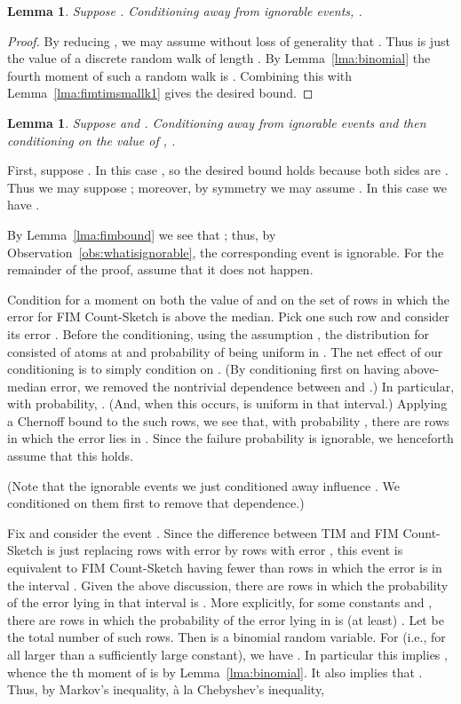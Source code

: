 \documentclass[letterpaper,11pt]{article}
\makeatletter
\newtheorem{lemma}[theorem]{Lemma}
\newenvironment{proof*}[1][\proofname]{\par 
\normalfont \partopsep=\z@skip \topsep=\z@skip 
  \trivlist 
  \item[\hskip\labelsep 
        \itshape 
    #1\@addpunct{.}]\ignorespaces 
}{\endtrivlist\@endpefalse 
}
\makeatother
\begin{document}
\begin{lemma} \label{lma:fimtimsmallk2}
Suppose .  Conditioning away from ignorable events, .
\end{lemma}
\begin{proof}
By reducing , we may assume without loss of generality that
.  Thus  is just the value of a discrete random walk
of length .  By Lemma~\ref{lma:binomial} the fourth
moment of such a random walk is .  Combining
this with Lemma~\ref{lma:fimtimsmallk1} gives the desired bound.
\end{proof}

\begin{lemma} \label{lma:fimtimsmallk3}
Suppose  and .  Conditioning away from ignorable events
and then conditioning on the value of ,
.
\end{lemma}
\begin{proof*}
First, suppose .  In this case ,
so the desired bound holds because both sides are .  Thus we may suppose ;
moreover, by symmetry we may assume .  In this case we have
.

By Lemma~\ref{lma:fimbound} we see that
; thus,
by Observation~\ref{obs:whatisignorable}, the corresponding
event is ignorable.  For the remainder of the proof, assume that it does not happen.

Condition for a moment on both the value of 
and on the set of  rows in which the error for FIM Count-Sketch
is above the median.  Pick one such row  and consider its error .
Before the conditioning, using the assumption ,
the distribution for  consisted of atoms at  and
 probability of being uniform in .  The net effect
of our conditioning is to simply condition on .
(By conditioning first on  having above-median error, we removed
the nontrivial dependence between  and .)
In particular, with  probability, .
(And, when this occurs,  is uniform in that interval.)
Applying a Chernoff bound to the 
such rows, we see that, with probability , there are
 rows in which the error lies in .
Since the failure probability is ignorable, we henceforth
assume that this holds.

(Note that the ignorable events we just conditioned away 
influence .  We conditioned on them first to remove that dependence.)

Fix  and consider the event .
Since the difference between TIM and FIM Count-Sketch is just replacing 
rows with error  by rows with error , this event is equivalent to FIM Count-Sketch
having fewer than  rows in which the error is in the interval
.
Given the above discussion, there are  rows in which the probability of
the error lying in that interval is .  More explicitly, for some
constants  and , there are  rows in which the probability of the error lying
in  is (at least) .  Let  be the total number of such rows.
Then  is a  binomial random variable.  For 
(i.e., for all  larger than a sufficiently large constant), we have .
In particular this implies , whence the th moment of
 is  by Lemma~\ref{lma:binomial}.  It also implies that
.
Thus, by Markov's inequality, \`a la Chebyshev's inequality,


\end{proof*}
\end{document}
